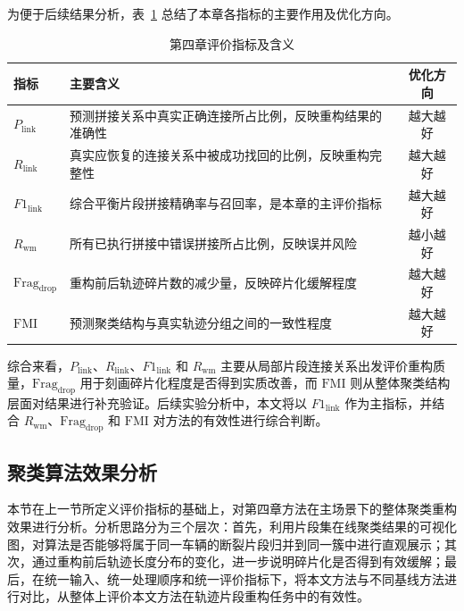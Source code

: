 \documentclass{xdupgthesis}
\begin{document}
为便于后续结果分析，表~\ref{tab:ch4_metric_summary} 总结了本章各指标的主要作用及优化方向。

\begin{table}[htbp]
	\centering
	\caption{第四章评价指标及含义}
	\label{tab:ch4_metric_summary}
	\renewcommand{\arraystretch}{1.2}
	\begin{tabular}{p{}p{}c}
		\toprule
		指标 & 主要含义 & 优化方向 \\
		\midrule
		$P_{\mathrm{link}}$ & 预测拼接关系中真实正确连接所占比例，反映重构结果的准确性 & 越大越好 \\
		$R_{\mathrm{link}}$ & 真实应恢复的连接关系中被成功找回的比例，反映重构完整性 & 越大越好 \\
		$F1_{\mathrm{link}}$ & 综合平衡片段拼接精确率与召回率，是本章的主评价指标 & 越大越好 \\
		$R_{\mathrm{wm}}$ & 所有已执行拼接中错误拼接所占比例，反映误并风险 & 越小越好 \\
		$\mathrm{Frag}_{\mathrm{drop}}$ & 重构前后轨迹碎片数的减少量，反映碎片化缓解程度 & 越大越好 \\
		$\mathrm{FMI}$ & 预测聚类结构与真实轨迹分组之间的一致性程度 & 越大越好 \\
		\bottomrule
	\end{tabular}
\end{table}

综合来看，$P_{\mathrm{link}}$、$R_{\mathrm{link}}$、$F1_{\mathrm{link}}$ 和 $R_{\mathrm{wm}}$ 主要从局部片段连接关系出发评价重构质量，$\mathrm{Frag}_{\mathrm{drop}}$ 用于刻画碎片化程度是否得到实质改善，而 $\mathrm{FMI}$ 则从整体聚类结构层面对结果进行补充验证。后续实验分析中，本文将以 $F1_{\mathrm{link}}$ 作为主指标，并结合 $R_{\mathrm{wm}}$、$\mathrm{Frag}_{\mathrm{drop}}$ 和 $\mathrm{FMI}$ 对方法的有效性进行综合判断。




\subsection{聚类算法效果分析}

本节在上一节所定义评价指标的基础上，对第四章方法在主场景下的整体聚类重构效果进行分析。分析思路分为三个层次：首先，利用片段集在线聚类结果的可视化图，对算法是否能够将属于同一车辆的断裂片段归并到同一簇中进行直观展示；其次，通过重构前后轨迹长度分布的变化，进一步说明碎片化是否得到有效缓解；最后，在统一输入、统一处理顺序和统一评价指标下，将本文方法与不同基线方法进行对比，从整体上评价本文方法在轨迹片段重构任务中的有效性。
\end{document}

